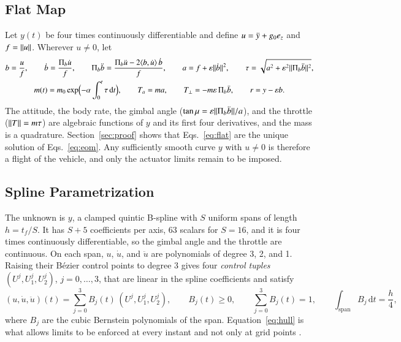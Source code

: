 \subsection{Flat Map}
Let $y(t)$ be four times continuously differentiable and define $u=\ddot y+g_0e_z$ and $f=\lVert u\rVert$. Wherever $u\ne0$, let
\begin{equation}\label{eq:flat}
\begin{gathered}
b=\frac uf,\qquad \dot b=\frac{\Pi_b\dot u}{f},\qquad \Pi_b\ddot b=\frac{\Pi_b\ddot u-2\langle b,\dot u\rangle\,\dot b}{f},\qquad
a=f+\varepsilon\lVert \dot b\rVert^2,\qquad \tau=\sqrt{a^2+\varepsilon^2\lVert \Pi_b\ddot b\rVert^2},\\
m(t)=m_0\exp\Bigl(-\alpha\int_0^t\tau\,\mathrm dt\Bigr),\qquad T_a=ma,\qquad T_\perp=-m\varepsilon\,\Pi_b\ddot b,\qquad r=y-\varepsilon b .
\end{gathered}
\end{equation}
The attitude, the body rate, the gimbal angle ($\tan\mu=\varepsilon\lVert \Pi_b\ddot b\rVert/a$), and the throttle ($\lVert T\rVert=m\tau$) are
algebraic functions of $y$ and its first four derivatives, and the mass is a quadrature. Section~\ref{sec:proof} shows that
Eqs.~\eqref{eq:flat} are the unique solution of Eqs.~\eqref{eq:eom}. Any sufficiently smooth curve $y$ with $u\ne0$ is
therefore a flight of the vehicle, and only the actuator limits remain to be imposed.

\subsection{Spline Parametrization}
The unknown is $y$, a clamped quintic B-spline with $S$ uniform spans of length $h=t_f/S$. It has $S+5$ coefficients per axis,
63 scalars for $S=16$, and it is four times continuously differentiable, so the gimbal angle and the throttle are continuous.
On each span, $u$, $\dot u$, and $\ddot u$ are polynomials of degree 3, 2, and 1. Raising their B\'ezier control points to
degree 3 gives four \emph{control tuples} $(U^j,U_1^j,U_2^j)$, $j=0,\dots,3$, that are linear in the spline coefficients and satisfy
\begin{equation}\label{eq:hull}
(u,\dot u,\ddot u)(t)=\sum_{j=0}^{3}B_j(t)\,(U^j,U_1^j,U_2^j),\qquad B_j(t)\ge0,\qquad \sum_{j=0}^{3}B_j(t)=1,\qquad \int_{\mathrm{span}}B_j\,\mathrm dt=\frac h4 ,
\end{equation}
where $B_j$ are the cubic Bernstein polynomials of the span. Equation~\eqref{eq:hull} is what allows limits to be enforced at
every instant and not only at grid points \cite{vanloock2015}.

